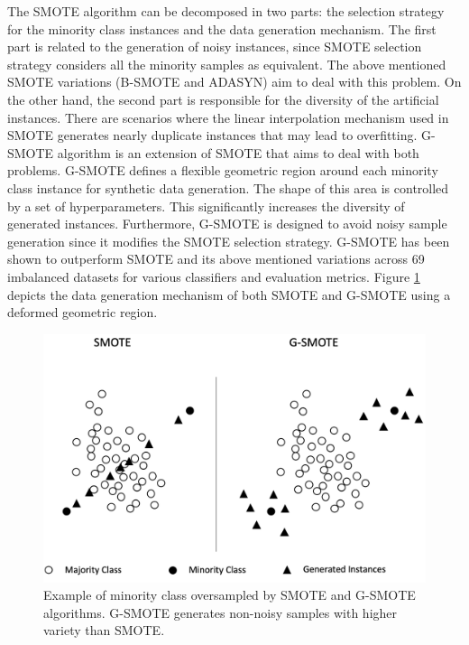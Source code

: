 \documentclass[remotesensing,article,submit,moreauthors,pdftex]{Definitions/mdpi}
\begin{document}
The SMOTE algorithm can be decomposed in two parts: the selection strategy for
the minority class instances and the data generation mechanism. The first part
is related to the generation of noisy instances, since SMOTE selection strategy
considers all the minority samples as equivalent. The above mentioned SMOTE
variations (B-SMOTE and ADASYN) aim to deal with this problem. On the other
hand, the second part is responsible for the diversity of the artificial
instances. There are scenarios where the linear interpolation mechanism used in
SMOTE generates nearly duplicate instances that may lead to overfitting. G-SMOTE
algorithm is an extension of SMOTE that aims to deal with both problems. G-SMOTE
defines a flexible geometric region around each minority class instance for
synthetic data generation. The shape of this area is controlled by a set of
hyperparameters. This significantly increases the diversity of generated
instances. Furthermore, G-SMOTE is designed to avoid noisy sample generation
since it modifies the SMOTE selection strategy. G-SMOTE has been shown to 
outperform SMOTE and its above  mentioned variations across 69 imbalanced
datasets for various classifiers and evaluation metrics. Figure
\ref{fig:gsmote_smote} depicts the data generation mechanism of both SMOTE and 
G-SMOTE using a deformed geometric region.

\begin{figure}[H]
	\centering
	\includegraphics[width=1\linewidth]{../analysis/gsmote_smote}
	\caption{Example of minority class oversampled by SMOTE and G-SMOTE
	algorithms. G-SMOTE generates non-noisy samples
	with higher variety than SMOTE.}
	\label{fig:gsmote_smote}
\end{figure}
\end{document}
